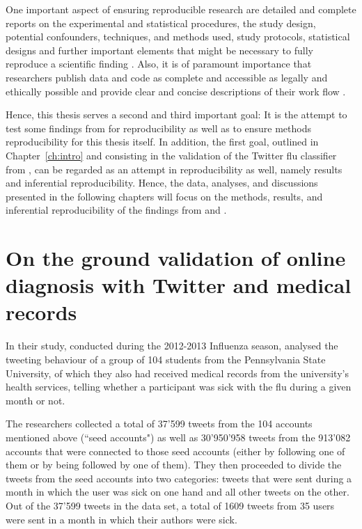 \documentclass[11pt, a4paper,twoside]{report}\usepackage[]{graphicx}\usepackage[]{color}
\begin{document}
One important aspect of ensuring reproducible research are detailed and complete reports on the experimental and statistical procedures, the study design, potential confounders, techniques, and methods used, study protocols, statistical designs and further important elements that might be necessary to fully reproduce a scientific finding \citep{kass_ten_2016}. Also, it is of paramount importance that researchers publish data and code as complete and accessible as legally and ethically possible and provide clear and concise descriptions of their work flow \citep{peng_reproducible_2006}.

Hence, this thesis serves a second and third important goal: It is the attempt to test some findings from \cite{bodnar_data_2015} for reproducibility as well as to ensure methods reproducibility for this thesis itself. In addition, the first goal, outlined in Chapter~\ref{ch:intro} and consisting in the validation of the Twitter flu classifier from \cite{bodnar_ground_2014}, can be regarded as an attempt in reproducibility as well, namely results and inferential reproducibility. Hence, the data, analyses, and discussions presented in the following chapters will focus on the methods, results, and inferential reproducibility of the findings from \cite{bodnar_ground_2014} and \cite{bodnar_data_2015}.

\section[On the ground validation of online diagnosis]{On the ground validation of online diagnosis with Twitter and medical records}
\label{sec:on_the_ground}
In their study, conducted during the 2012-2013 Influenza season, \cite{bodnar_ground_2014} analysed the tweeting behaviour of a group of 104 students from the Pennsylvania State University, of which they also had received medical records from the university's health services, telling whether a participant was sick with the flu during a given month or not.

The researchers collected a total of 37'599 tweets from the 104 accounts mentioned above (``seed accounts") as well as 30'950'958 tweets from the 913'082 accounts that were connected to those seed accounts (either by following one of them or by being followed by one of them). They then proceeded to divide the tweets from the seed accounts into two categories: tweets that were sent during a month in which the user was sick on one hand and all other tweets on the other. Out of the 37'599 tweets in the data set, a total of 1609 tweets from 35 users were sent in a month in which their authors were sick.
\end{document}
